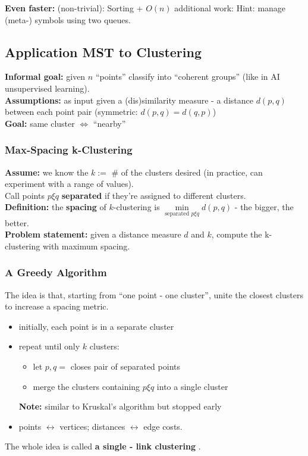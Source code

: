 \documentclass{scrartcl}
\begin{document}
{\bf Even faster: } (non-trivial): Sorting + $O(n)$ additional work: Hint:
manage (meta-) symbols using two queues.

\subsection{Application MST to Clustering}
\label{sec:8-1}
{\bf Informal goal: } given $n$ ``points'' classify into ``coherent groups''
(like in AI unsupervised learning). \\
{\bf Assumptions: } as input given a (dis)similarity measure - a distance $d(p,
q)$ between each point pair (symmetric: $d(p,q) = d(q,p)$)\\

{\bf Goal: } same cluster $\Leftrightarrow$ ``nearby''
\subsubsection{Max-Spacing k-Clustering}
\label{sec:8-1-1}
{\bf Assume: } we know the $k := $ \# of the clusters desired (in practice, can
experiment with a range of values).\\
Call points $p \xi q$ {\bf separated } if they're assigned to different
clusters. \\
{\bf Definition: } the {\bf spacing } of $k$-clustering is $\min
\limits_{\text{separated } p \xi q} d(p, q)$ - the bigger, the better.\\

{\bf Problem statement: } given a distance measure $d$ and $k$, compute the
k-clustering with maximum spacing.
\subsubsection{A Greedy Algorithm}
\label{sec:8-1-2}
The idea is that, starting from ``one point - one cluster'', unite the closest
clusters to increase a spacing metric.\\
\begin{itemize}
\item initially, each point is in a separate cluster
\item repeat until only $k$ clusters:
  \begin{itemize}
  \item let $p, q = $ closes pair of separated points
  \item merge the clusters containing $p \xi q$ into a single cluster
  \end{itemize}
{\bf Note: } similar to Kruskal's algorithm but stopped early
\item points $\leftrightarrow$ vertices; distances $\leftrightarrow$ edge costs.
\end{itemize}
The whole idea is called {\bf a single - link clustering }.
\end{document}
